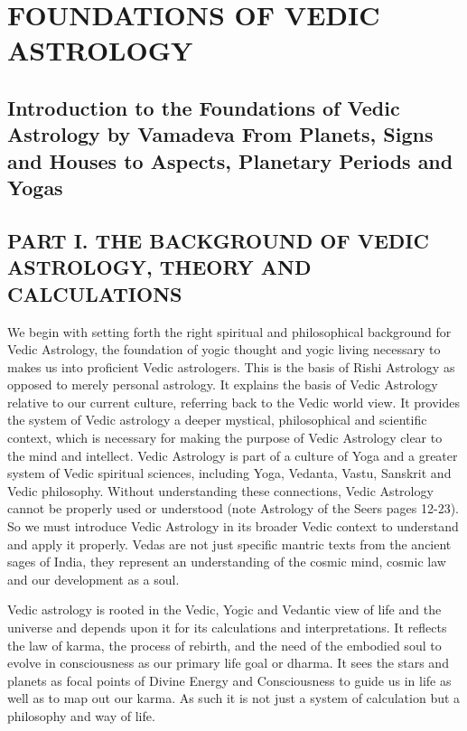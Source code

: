 \section{FOUNDATIONS OF VEDIC ASTROLOGY}
 
\subsection{\textbf{Introduction to the Foundations of Vedic Astrology by Vamadeva
From Planets, Signs and Houses to Aspects, Planetary Periods and Yogas}}

 

\subsection{PART I. THE BACKGROUND OF VEDIC ASTROLOGY, THEORY AND CALCULATIONS}
 

We begin with setting forth the right spiritual and philosophical background for Vedic Astrology, the foundation of yogic thought and yogic living necessary to makes us into proficient Vedic astrologers. This is the basis of Rishi Astrology as opposed to merely personal astrology. It explains the basis of Vedic Astrology relative to our current culture, referring back to the Vedic world view. It provides the system of Vedic astrology a deeper mystical, philosophical and scientific context, which is necessary for making the purpose of Vedic Astrology clear to the mind and intellect. Vedic Astrology is part of a culture of Yoga and a greater system of Vedic spiritual sciences, including Yoga, Vedanta, Vastu, Sanskrit and Vedic philosophy. Without understanding these connections, Vedic Astrology cannot be properly used or understood (note Astrology of the Seers pages 12-23). So we must introduce Vedic Astrology in its broader Vedic context to understand and apply it properly. Vedas are not just specific mantric texts from the ancient sages of India, they represent an understanding of the cosmic mind, cosmic law and our development as a soul.

 

Vedic astrology is rooted in the Vedic, Yogic and Vedantic view of life and the universe and depends upon it for its calculations and interpretations. It reflects the law of karma, the process of rebirth, and the need of the embodied soul to evolve in consciousness as our primary life goal or dharma. It sees the stars and planets as focal points of Divine Energy and Consciousness to guide us in life as well as to map out our karma. As such it is not just a system of calculation but a philosophy and way of life.

